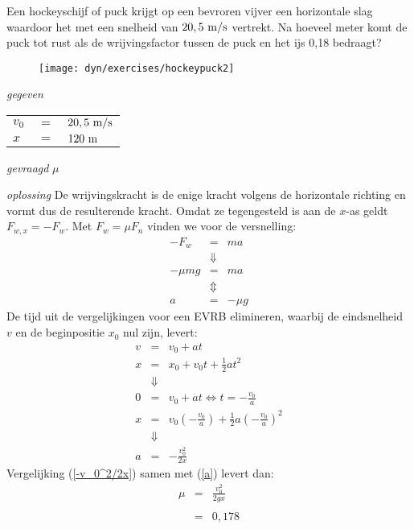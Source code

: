 
\begin{exercise}

 Een hockeyschijf of puck krijgt op een bevroren vijver een horizontale slag waardoor het met een snelheid van $20,5~\rm m/s$ vertrekt. Na hoeveel meter komt de puck tot rust als de wrijvingsfactor tussen de puck en het ijs 0,18 bedraagt? %
\begin{oplossing}
\begin{figure}[h]
\begin{center}
\texttt{[image: dyn/exercises/hockeypuck2]}
\end{center}
\end{figure}
\newline
\item [\textit{gegeven}]
\begin{tabular}[t]{lcl}
$v_0$ &$=$& $20,5~\rm m/s$\\
$x$ &$=$& $120~\rm m$\\
\end{tabular}
\item [\textit{gevraagd}]
$\mu$
\item [\textit{oplossing}]
De wrijvingskracht is de enige kracht volgens de horizontale
richting en vormt dus de resulterende kracht. Omdat ze tegengesteld
is aan de $x$-as geldt $F_{w,x}=-F_w$. Met $F_w=\mu F_n$ vinden we
voor de versnelling:
\begin{eqnarray}
-F_w &=& ma\nonumber\\
&\Downarrow& \nonumber\\
-\mu mg &=&ma\nonumber\\
&\Updownarrow& \nonumber\\
a &=& -\mu g\label{a}
\end{eqnarray}
De tijd uit de vergelijkingen voor een EVRB elimineren, waarbij de
eindsnelheid $v$ en de beginpositie $x_0$ nul zijn, levert:
\begin{eqnarray}
v&=&v_0+at\nonumber\\
x&=&x_0+v_0t+\frac{1}{2}at^2\nonumber\\
&\Downarrow&\nonumber\\
0&=&v_0+at\Leftrightarrow t=-\frac{v_0}{a}\nonumber\\
x&=&v_0\left(-\frac{v_0}{a}\right)+\frac{1}{2}a\left(-\frac{v_0}{a}\right)^2\nonumber\\
&\Downarrow&\nonumber\\
a&=&-\frac{v_0^2}{2x}\label{-v_0^2/2x}
\end{eqnarray}
Vergelijking (\ref{-v_0^2/2x}) samen met (\ref{a}) levert dan:
\begin{eqnarray}
\mu &=& \frac{v_0^2}{2gx}\label{remvgl}\\
&&\nonumber\\
&=& 0,178\nonumber
\end{eqnarray}
\end{oplossing}

\end{exercise}
